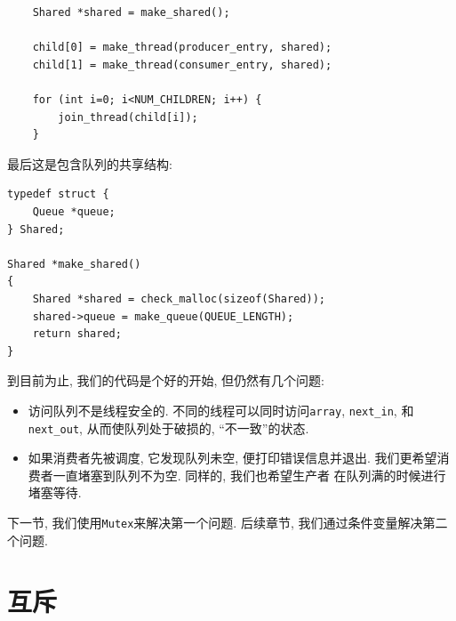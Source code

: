 \documentclass[12pt]{book}
\begin{document}
{\begin{verbatim}
    Shared *shared = make_shared();

    child[0] = make_thread(producer_entry, shared);
    child[1] = make_thread(consumer_entry, shared);

    for (int i=0; i<NUM_CHILDREN; i++) {
        join_thread(child[i]);
    }
\end{verbatim}

最后这是包含队列的共享结构:

\begin{verbatim}
typedef struct {
    Queue *queue;
} Shared;

Shared *make_shared()
{
    Shared *shared = check_malloc(sizeof(Shared));
    shared->queue = make_queue(QUEUE_LENGTH);
    return shared;
}
\end{verbatim}

到目前为止, 我们的代码是个好的开始, 但仍然有几个问题:

\begin{itemize}

\item 访问队列不是线程安全的. 不同的线程可以同时访问{\tt array}, 
\verb"next_in", 和 \verb"next_out", 从而使队列处于破损的, ``不一致''的状态.

\item 如果消费者先被调度, 它发现队列未空, 便打印错误信息并退出.
我们更希望消费者一直堵塞到队列不为空. 同样的, 我们也希望生产者
在队列满的时候进行堵塞等待. 

\end{itemize}

下一节, 我们使用{\tt Mutex}来解决第一个问题.
后续章节, 我们通过条件变量解决第二个问题.


\section{互斥}

}
\end{document}
